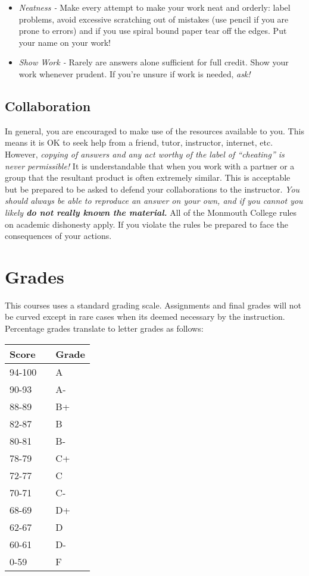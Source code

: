 \documentclass[10pt]{article}
\begin{document}
\begin{itemize}
\begin{itemize}
\item \textit{Neatness - }  Make every attempt to make your work neat and orderly:  label problems, avoid excessive scratching out of mistakes (use pencil if you are prone to errors) and if you use spiral bound paper tear off the edges. Put your name on your work!

\item \textit{Show Work - } Rarely are answers alone sufficient for full credit.  Show your work whenever prudent.  If you're unsure if work is needed, \textit{ask!}
\end{itemize}

\end{itemize}


\subsection{Collaboration}

In general, you are encouraged to make use of the resources available to you.  This means it is OK to seek help from a friend, tutor, instructor, internet, etc.  However, \textit{copying of answers and any act worthy of the label of ``cheating'' is never permissible!}  It is understandable that when you work with a partner or a group that the resultant product is often extremely similar.  This is acceptable but be prepared to be asked to defend your collaborations to the instructor.  \textit{You should always be able to reproduce an answer on your own, and if you cannot you likely \textbf{do not really known the material.}} All of the Monmouth College rules on academic dishonesty apply.  If you violate the rules be prepared to face the consequences of your actions.  

\section{Grades}

This courses uses a standard grading scale.  Assignments and final grades will not be curved except in rare cases when its deemed necessary by the instruction.  Percentage grades translate to letter grades as follows:

\begin{center}
\begin{small}
\begin{tabular}{lcl}
Score & & Grade \\ \hline
94-100 & & A \\
90-93 & & A- \\
88-89 & & B+ \\
82-87 & & B \\
80-81 & & B- \\
78-79 & & C+ \\
72-77 & & C \\
70-71 & & C- \\
68-69 & & D+ \\
62-67 & & D \\
60-61 & & D- \\
0-59 & & F 
\end{tabular}
\end{small}
\end{center}
\end{document}

